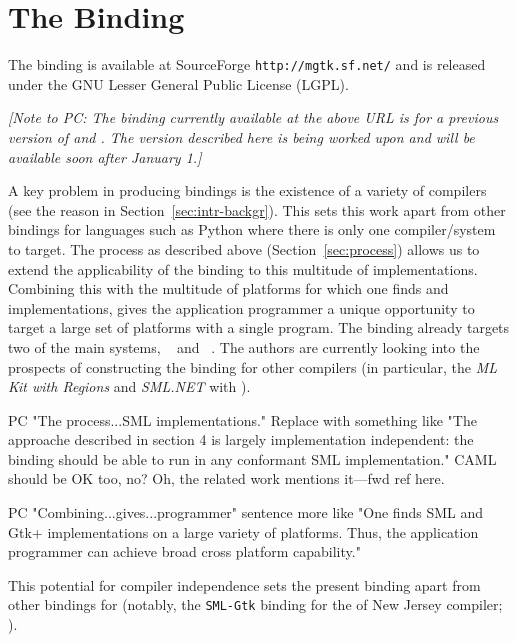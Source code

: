 \documentclass[workingdraft]{usetex-v1}
\begin{document}
\section{The \mgtk Binding}
\label{sec:mgtk-binding}

The \mgtk binding is available at SourceForge \texttt{http://mgtk.sf.net/}
and is released under the GNU Lesser General Public License
(LGPL).

\textit{[Note to PC: The binding currently available at the above URL
  is for a previous version of \mgtk and \gtk. The version described here is
  being worked upon and will be available soon after January 1.]}

A key problem in producing \sml bindings is the existence of a variety
of compilers (see the reason in Section~\ref{sec:intr-backgr}). This
sets this work apart from other bindings for languages such as Python
where there is only one compiler/system to target. The process as
described above (Section~\ref{sec:process}) allows us to extend the
applicability of the binding to this multitude of \sml
implementations. Combining this with the multitude of platforms for
which one finds \sml and \gtk implementations, gives the application
programmer a unique opportunity to target a large set of platforms
with a single program. The \mgtk binding already targets two of the
main \sml systems, \mosml~\cite{Mosml-webpage:2003} and
\mlton~\cite{MLton-webpage:2003}. The authors are currently looking
into the prospects of constructing the binding for other \sml
compilers (in particular, the \emph{ML Kit with Regions}
\cite{MLKit-webpage:2003} and \emph{SML.NET}
\cite{SML.NET-webpage:2003} with \gtksharp).

\begin{ednote}{PC}
  "The process...SML implementations."  Replace with something like
  "The approache described in section 4 is largely implementation
  independent: the binding should be able to run in any conformant SML
  implementation."  CAML should be OK too, no?  Oh, the related work
  mentions it---fwd ref here.
\end{ednote}


\begin{ednote}{PC}
  "Combining...gives...programmer" sentence more like "One finds SML
  and Gtk+ implementations on a large variety of platforms.  Thus, the
  application programmer can achieve broad cross platform capability."
\end{ednote}

This potential for compiler independence sets the present
binding apart from other \gtk bindings for \sml (notably, the
\texttt{SML-Gtk} binding for the \sml of New Jersey \sml compiler;
\cite{SML-Gtk-webpage:2003}).
\end{document}
